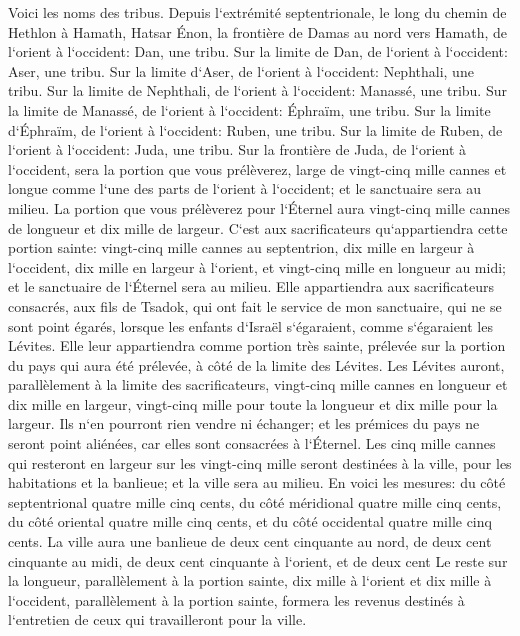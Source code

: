 \verse Voici les noms des tribus. Depuis l`extrémité septentrionale, le long du chemin de Hethlon à Hamath, Hatsar Énon, la frontière de Damas au nord vers Hamath, de l`orient à l`occident: Dan, une tribu. 
\verse Sur la limite de Dan, de l`orient à l`occident: Aser, une tribu. 
\verse Sur la limite d`Aser, de l`orient à l`occident: Nephthali, une tribu. 
\verse Sur la limite de Nephthali, de l`orient à l`occident: Manassé, une tribu. 
\verse Sur la limite de Manassé, de l`orient à l`occident: Éphraïm, une tribu. 
\verse Sur la limite d`Éphraïm, de l`orient à l`occident: Ruben, une tribu. 
\verse Sur la limite de Ruben, de l`orient à l`occident: Juda, une tribu. 
\verse Sur la frontière de Juda, de l`orient à l`occident, sera la portion que vous prélèverez, large de vingt-cinq mille cannes et longue comme l`une des parts de l`orient à l`occident; et le sanctuaire sera au milieu. 
\verse La portion que vous prélèverez pour l`Éternel aura vingt-cinq mille cannes de longueur et dix mille de largeur. 
\verse C`est aux sacrificateurs qu`appartiendra cette portion sainte: vingt-cinq mille cannes au septentrion, dix mille en largeur à l`occident, dix mille en largeur à l`orient, et vingt-cinq mille en longueur au midi; et le sanctuaire de l`Éternel sera au milieu. 
\verse Elle appartiendra aux sacrificateurs consacrés, aux fils de Tsadok, qui ont fait le service de mon sanctuaire, qui ne se sont point égarés, lorsque les enfants d`Israël s`égaraient, comme s`égaraient les Lévites. 
\verse Elle leur appartiendra comme portion très sainte, prélevée sur la portion du pays qui aura été prélevée, à côté de la limite des Lévites. 
\verse Les Lévites auront, parallèlement à la limite des sacrificateurs, vingt-cinq mille cannes en longueur et dix mille en largeur, vingt-cinq mille pour toute la longueur et dix mille pour la largeur. 
\verse Ils n`en pourront rien vendre ni échanger; et les prémices du pays ne seront point aliénées, car elles sont consacrées à l`Éternel. 
\verse Les cinq mille cannes qui resteront en largeur sur les vingt-cinq mille seront destinées à la ville, pour les habitations et la banlieue; et la ville sera au milieu. 
\verse En voici les mesures: du côté septentrional quatre mille cinq cents, du côté méridional quatre mille cinq cents, du côté oriental quatre mille cinq cents, et du côté occidental quatre mille cinq cents. 
\verse La ville aura une banlieue de deux cent cinquante au nord, de deux cent cinquante au midi, de deux cent cinquante à l`orient, et de deux cent 
\verse Le reste sur la longueur, parallèlement à la portion sainte, dix mille à l`orient et dix mille à l`occident, parallèlement à la portion sainte, formera les revenus destinés à l`entretien de ceux qui travailleront pour la ville. 
